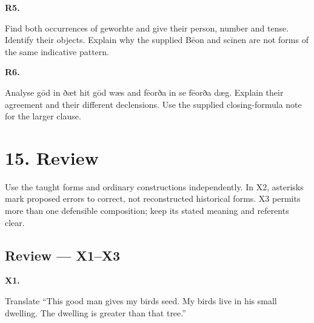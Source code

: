 \par\begin{minipage}{\linewidth}\raggedright
\textbf{R5.}

Find both occurrences of geworhte and give their person, number and tense. Identify their objects. Explain why the supplied Bēon and scīnen are not forms of the same indicative pattern.

\end{minipage}\par\addvspace{4pt}

\par\begin{minipage}{\linewidth}\raggedright
\textbf{R6.}

Analyse gōd in ðæt hit gōd wæs and fēorða in se fēorða dæg. Explain their agreement and their different declensions. Use the supplied closing-formula note for the larger clause.

\end{minipage}\par\addvspace{4pt}

\section*{15. Review}

Use the taught forms and ordinary constructions independently. In X2, asterisks mark proposed errors to correct, not reconstructed historical forms. X3 permits more than one defensible composition; keep its stated meaning and referents clear.

\subsection*{Review — X1–X3}

\par\begin{minipage}{\linewidth}\raggedright
\textbf{X1.}

Translate “This good man gives my birds seed. My birds live in his small dwelling. The dwelling is greater than that tree.”

\end{minipage}\par\addvspace{4pt}

